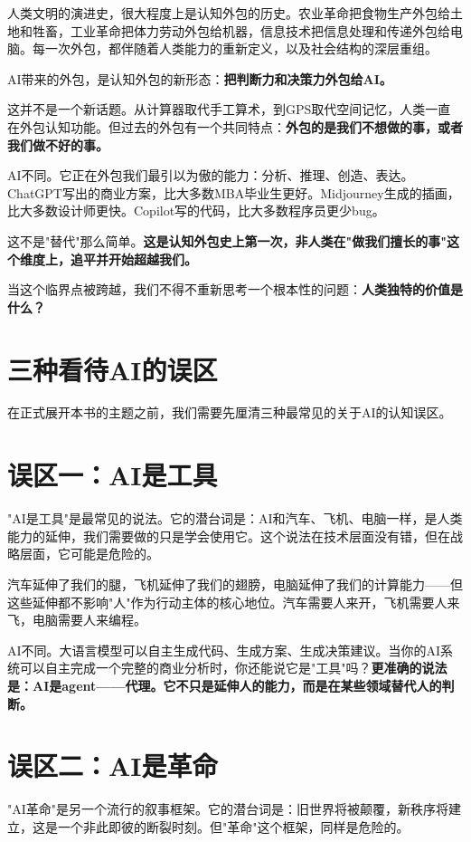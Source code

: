 人类文明的演进史，很大程度上是认知外包的历史。农业革命把食物生产外包给土地和牲畜，工业革命把体力劳动外包给机器，信息技术把信息处理和传递外包给电脑。每一次外包，都伴随着人类能力的重新定义，以及社会结构的深层重组。

AI带来的外包，是认知外包的新形态：\textbf{把判断力和决策力外包给AI。}

这并不是一个新话题。从计算器取代手工算术，到GPS取代空间记忆，人类一直在外包认知功能。但过去的外包有一个共同特点：\textbf{外包的是我们不想做的事，或者我们做不好的事。}

AI不同。它正在外包我们最引以为傲的能力：分析、推理、创造、表达。ChatGPT写出的商业方案，比大多数MBA毕业生更好。Midjourney生成的插画，比大多数设计师更快。Copilot写的代码，比大多数程序员更少bug。

这不是"替代"那么简单。\textbf{这是认知外包史上第一次，非人类在"做我们擅长的事"这个维度上，追平并开始超越我们。}

当这个临界点被跨越，我们不得不重新思考一个根本性的问题：\textbf{人类独特的价值是什么？}


\section{三种看待AI的误区}


在正式展开本书的主题之前，我们需要先厘清三种最常见的关于AI的认知误区。

\section{误区一：AI是工具}


"AI是工具"是最常见的说法。它的潜台词是：AI和汽车、飞机、电脑一样，是人类能力的延伸，我们需要做的只是学会使用它。这个说法在技术层面没有错，但在战略层面，它可能是危险的。

汽车延伸了我们的腿，飞机延伸了我们的翅膀，电脑延伸了我们的计算能力——但这些延伸都不影响"人"作为行动主体的核心地位。汽车需要人来开，飞机需要人来飞，电脑需要人来编程。

AI不同。大语言模型可以自主生成代码、生成方案、生成决策建议。当你的AI系统可以自主完成一个完整的商业分析时，你还能说它是"工具"吗？\textbf{更准确的说法是：AI是agent——代理。它不只是延伸人的能力，而是在某些领域替代人的判断。}

\section{误区二：AI是革命}


"AI革命"是另一个流行的叙事框架。它的潜台词是：旧世界将被颠覆，新秩序将建立，这是一个非此即彼的断裂时刻。但"革命"这个框架，同样是危险的。

